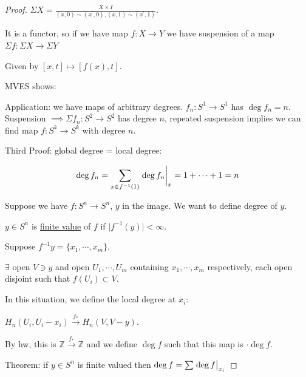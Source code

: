 \documentclass{article}
\theoremstyle{definition}
\begin{document}
\begin{proof}
        \(\Sigma X = \frac{X \times I}{(x,0)\sim (x^{\prime},0), (x,1)\sim (x^{\prime} , 1)}\).
        
        It is a functor, so if we have map \(f: X \to Y\) we have suspension of a map \(\Sigma f: \Sigma X \to \Sigma Y\)
        
        Given by \([x,t] \mapsto [f(x),t]\).

        MVES shows:

        \begin{center}
        \end{center}

        Application: we have maps of arbitrary degrees. \(f_n: S^1 \to S^1\) has \(\deg f_n = n\). Suspension \(\implies \Sigma f_n : S^2 \to S^2\) has degree \(n\), repeated suspension implies we can find map \(f: S^k \to S^k\) with degree \(n\).

        Third Proof: global degree = local degree:

        \[
            \deg f_n = \sum_{x\in f ^{-1}(1)} \eval{\deg f_n}_x = 1 + \cdots + 1 = n 
        \]

        Suppose we have \(f: S^n \to S^n\), \(y\) in the image. We want to define degree of \(y\).
        
        \(y\in S^n\) is \underline{finite value} of \(f\) if \(\vert f ^{-1} (y) \vert < \infty\).

        Suppose \(f ^{-1} y = \{ x_1, \cdots , x_m \}\).

        \(\exists\) open \(V \ni y\) and open \(U_1, \cdots , U_m\) containing \(x_1, \cdots , x_m\) respectively, each open disjoint such that \(f(U_i) \subset V\).

        In this situation, we define the local degree at \(x_i\):

        \(H_n(U_i, U_i - x_i) \xrightarrow{f_{\ast}} H_n(V,V-y)\).
        
        By hw, this is \(\mathbb{Z} \xrightarrow{f_\ast} \mathbb{Z}\) and we define \(\deg f\) such that this map is \(\cdot \deg f\).
        
        Theorem: if \(y\in S^n\) is finite valued then \(\deg f = \sum \eval{\deg f}_{x_i}\) 
    
    \end{proof}
\end{document}
